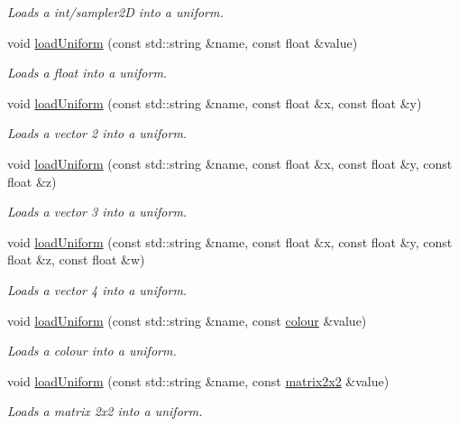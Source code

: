 \begin{DoxyCompactItemize}
\begin{DoxyCompactList}\small\item\em Loads a int/sampler2D into a uniform. \end{DoxyCompactList}\item 
void \hyperlink{classflounder_1_1shader_acd349b44107fc3389856a124da305d62}{load\+Uniform} (const std\+::string \&name, const float \&value)
\begin{DoxyCompactList}\small\item\em Loads a float into a uniform. \end{DoxyCompactList}\item 
void \hyperlink{classflounder_1_1shader_a3c14875fd04a7a824d2af9e737bde626}{load\+Uniform} (const std\+::string \&name, const float \&x, const float \&y)
\begin{DoxyCompactList}\small\item\em Loads a vector 2 into a uniform. \end{DoxyCompactList}\item 
void \hyperlink{classflounder_1_1shader_abd782c5f1e6fb7f1d7f8fcf5d0c8b43c}{load\+Uniform} (const std\+::string \&name, const float \&x, const float \&y, const float \&z)
\begin{DoxyCompactList}\small\item\em Loads a vector 3 into a uniform. \end{DoxyCompactList}\item 
void \hyperlink{classflounder_1_1shader_a54caa7d0462b98679dd902d6256a6e8b}{load\+Uniform} (const std\+::string \&name, const float \&x, const float \&y, const float \&z, const float \&w)
\begin{DoxyCompactList}\small\item\em Loads a vector 4 into a uniform. \end{DoxyCompactList}\item 
void \hyperlink{classflounder_1_1shader_a6fed325128b3437f435a4ca327ea416e}{load\+Uniform} (const std\+::string \&name, const \hyperlink{classflounder_1_1colour}{colour} \&value)
\begin{DoxyCompactList}\small\item\em Loads a colour into a uniform. \end{DoxyCompactList}\item 
void \hyperlink{classflounder_1_1shader_a257fff86a8d24c657724fa14ac0ef12e}{load\+Uniform} (const std\+::string \&name, const \hyperlink{classflounder_1_1matrix2x2}{matrix2x2} \&value)
\begin{DoxyCompactList}\small\item\em Loads a matrix 2x2 into a uniform. \end{DoxyCompactList}\item 

\end{DoxyCompactItemize}
